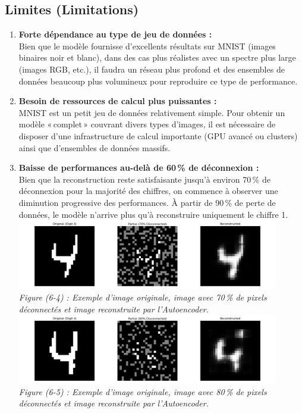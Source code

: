 \documentclass[a4paper,12pt]{article}
\begin{document}
\subsection{Limites (Limitations)}
\begin{enumerate}
    \item \textbf{Forte dépendance au type de jeu de données :}\\
    Bien que le modèle fournisse d’excellents résultats sur MNIST (images binaires noir et blanc), dans des cas plus réalistes avec un spectre plus large (images RGB, etc.), il faudra un réseau plus profond et des ensembles de données beaucoup plus volumineux pour reproduire ce type de performance.

    \item \textbf{Besoin de ressources de calcul plus puissantes :}\\
    MNIST est un petit jeu de données relativement simple. Pour obtenir un modèle «\,complet\,» couvrant divers types d'images, il est nécessaire de disposer d'une infrastructure de calcul importante (GPU avancé ou clusters) ainsi que d'ensembles de données massifs.

    \item \textbf{Baisse de performances au-delà de 60\,\% de déconnexion :}\\
    Bien que la reconstruction reste satisfaisante jusqu'à environ 70\,\% de déconnexion pour la majorité des chiffres, on commence à observer une diminution progressive des performances. À partir de 90\,\% de perte de données, le modèle n'arrive plus qu'à reconstruire uniquement le chiffre 1.\\

    \includegraphics[width=0.9\textwidth]{sample_15.png}\\
    \emph{Figure (6-4) : Exemple d'image originale, image avec 70\,\% de pixels déconnectés et image reconstruite par l’Autoencoder.}\\
    \includegraphics[width=0.9\textwidth]{sample_11.png}\\
    \emph{Figure (6-5) : Exemple d'image originale, image avec 80\,\% de pixels déconnectés et image reconstruite par l’Autoencoder.}\\

\end{enumerate}
\end{document}
